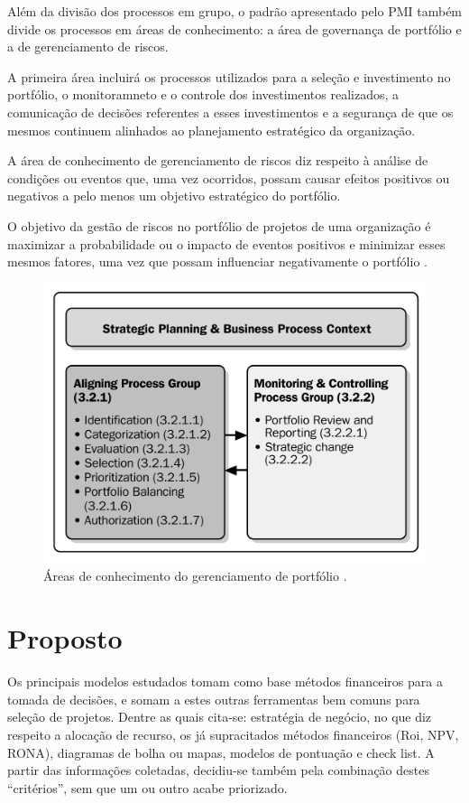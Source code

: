 \documentclass[12pt,a4paper,ruledheader,tocpage=prefix,floatnumber=continuous,pagestart=folhaderosto,font=times]{abnt}
\begin{document}
Além da divisão dos processos em grupo, o padrão apresentado pelo PMI também divide os processos em áreas de conhecimento: a área de governança de 
portfólio e a de gerenciamento de riscos.

A primeira área incluirá os processos utilizados para a seleção e investimento no portfólio, o monitoramneto e o controle dos investimentos realizados, 
a comunicação de decisões referentes a esses investimentos e a segurança de que os mesmos continuem alinhados ao planejamento estratégico da organização.

A área de conhecimento de gerenciamento de riscos diz respeito à análise de condições ou eventos que, uma vez ocorridos, possam causar efeitos positivos 
ou negativos a pelo menos um objetivo estratégico do portfólio. 

O objetivo da gestão de riscos no portfólio de projetos de uma organização é maximizar a probabilidade ou o impacto de eventos positivos e minimizar 
esses mesmos fatores, uma vez que possam influenciar negativamente o portfólio \cite{sppm}.


\begin{figure}[H]
\centering
\includegraphics[width=.9\textwidth]{areas_conhecimento_pmi.png}
\caption{Áreas de conhecimento do gerenciamento de portfólio \cite{sppm}.}
\end{figure}

\section{Proposto}
Os principais modelos estudados tomam como base métodos financeiros para a tomada de decisões, e somam a estes outras ferramentas bem comuns para seleção 
de projetos. Dentre as quais cita-se: estratégia de negócio, no que diz respeito a alocação de recurso, os já supracitados métodos financeiros (Roi, NPV,
RONA), diagramas de bolha ou mapas, modelos de pontuação e check list. A partir das informações coletadas, decidiu-se também pela combinação destes 
``critérios'', sem que um ou outro acabe priorizado.
\end{document}
